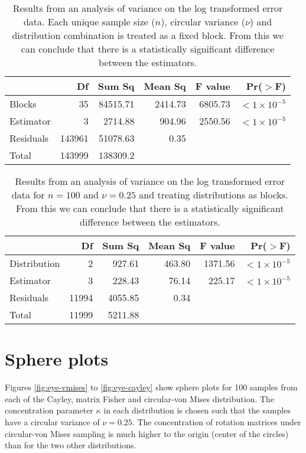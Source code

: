 \begin{table}[h!]
\caption{Results from an analysis of variance on the log transformed error data.  Each unique sample size ($n$), circular variance ($\nu$) and distribution combination is treated as a fixed block.  From this we can conclude that there is a statistically significant difference between the estimators.}
\begin{center}
\begin{tabular}{lrrrrr}
  \hline
 & Df & Sum Sq & Mean Sq & F value & Pr($>$F) \\ 
  \hline
Blocks      & 35 & 84515.71 & 2414.73 & 6805.73 & $<1\times 10^{-5}$ \\ 
Estimator   & 3 & 2714.88 & 904.96 & 2550.56 & $<1\times 10^{-5}$ \\ 
Residuals   & 143961 & 51078.63 & 0.35 &  &  \\ \hline
Total & 143999 & 138309.2&&&\\
   \hline
\end{tabular}
\end{center}
\end{table}

\begin{table}[h!]
\caption{Results from an analysis of variance on the log transformed error data for $n=100$ and $\nu=0.25$ and treating distributions as blocks.  From this we can conclude that there is a statistically significant difference between the estimators.}
\begin{center}
\begin{tabular}{lrrrrr}
  \hline
 & Df & Sum Sq & Mean Sq & F value & Pr($>$F) \\ 
  \hline
Distribution       & 2 & 927.61 & 463.80 & 1371.56 & $<1\times 10^{-5}$ \\ 
Estimator   & 3 & 228.43 & 76.14 & 225.17 & $<1\times 10^{-5}$ \\ 
Residuals   & 11994 & 4055.85 & 0.34 &  &  \\ \hline
Total & 11999 & 5211.88 &&&\\
   \hline
\end{tabular}
\end{center}
\end{table}


\section{Sphere plots}
\label{sec:appendix.eyeballs}
Figures \ref{fig:eye-vmises} to \ref{fig:eye-cayley} show sphere plots for 100 samples from each of the Cayley, matrix Fisher and circular-von Mises distribution. The concentration parameter $\kappa$ in each distribution is chosen such that the samples have a circular variance of $\nu = 0.25$. The concentration of rotation matrices under circular-von Mises sampling is much higher to the origin (center of the circles) than for the two other distributions.


